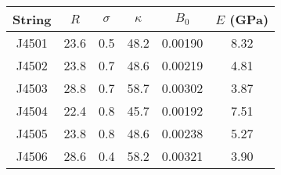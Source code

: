 \begin{tabular}{cccccc}
\toprule
String & $R$ & $\sigma$ & $\kappa$ & $B_0$ & $E$ (GPa) \\
\midrule
J4501 & 23.6 & 0.5 & 48.2 & 0.00190 & 8.32 \\
J4502 & 23.8 & 0.7 & 48.6 & 0.00219 & 4.81 \\
J4503 & 28.8 & 0.7 & 58.7 & 0.00302 & 3.87 \\
J4504 & 22.4 & 0.8 & 45.7 & 0.00192 & 7.51 \\
J4505 & 23.8 & 0.8 & 48.6 & 0.00238 & 5.27 \\
J4506 & 28.6 & 0.4 & 58.2 & 0.00321 & 3.90 \\
\bottomrule
\end{tabular}

